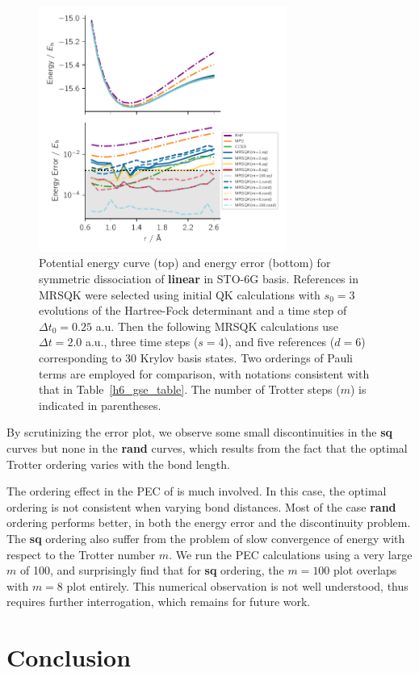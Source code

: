 \documentclass[journal=jctcce,manuscript=article]{achemso}
\newcommand{\methodabbr}[0]{MRSQK\xspace}
\begin{document}
\begin{figure}[h!]
  \centering
  \includegraphics[width=3.2in]{figs/BeH2_pes_error.pdf}
  \caption{Potential energy curve (top) and energy error (bottom) for symmetric dissociation of \textbf{linear } in STO-6G basis.
  References in \methodabbr were selected using initial QK calculations with $s_0 = 3$ evolutions of the Hartree-Fock determinant and a time step of $ \Delta t_0 = 0.25$ a.u.
  Then the following \methodabbr calculations use $ \Delta t = 2.0$ a.u., three time steps ($s=4$), and five references ($d=6$) corresponding to 30 Krylov basis states. 
  Two orderings of Pauli terms are employed for comparison, with notations consistent with that in Table~\ref{h6_gse_table}.
  The number of Trotter steps ($m$) is indicated in parentheses.
   }
\label{beh2_pes}
\end{figure}
By scrutinizing the error plot, we observe some small discontinuities in the \textbf{sq} curves but none in the \textbf{rand} curves, which results from the fact that the optimal Trotter ordering varies with the bond length.\cite{tranter2019ordering}

The ordering effect in the PEC of  is much involved. In this case, the optimal ordering is not consistent when varying bond distances.
Most of the case \textbf{rand} ordering performs better, in both the energy error and the discontinuity problem. The \textbf{sq} ordering also suffer from the problem of slow convergence of energy with respect to the Trotter number $m$. We run the PEC calculations using a very large $m$ of 100, and surprisingly find that for \textbf{sq} ordering, the $m=100$ plot overlaps with $m=8$ plot entirely. This numerical observation is not well understood, thus requires further interrogation, which remains for future work.
\section{Conclusion}






\newpage

{}
\end{document}
